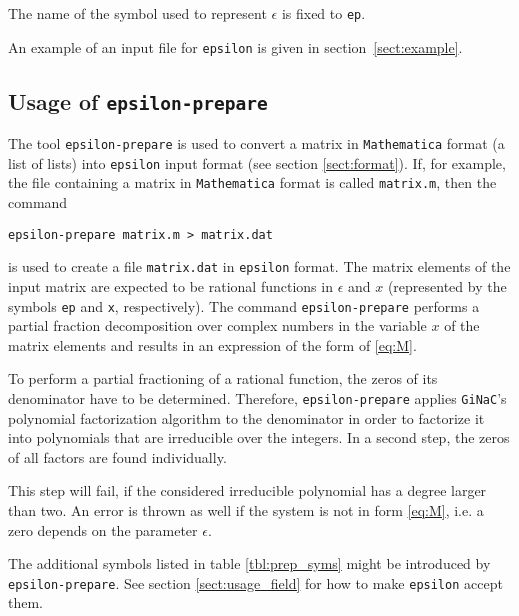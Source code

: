 \documentclass[12pt]{article}
\numberwithin{equation}{section}
\numberwithin{figure}{section}
\begin{document}
      The name of the symbol used to represent $\epsilon$ is fixed to \texttt{ep}.

      An example of an input file for \texttt{epsilon} is given in section~\ref{sect:example}.
    \subsection{Usage of \texttt{epsilon-prepare}}
      The tool \texttt{epsilon-prepare} is used to convert a matrix in \texttt{Mathematica} format (a list of lists) into \texttt{epsilon} input format (see section \ref{sect:format}).
      If, for example, the file containing a matrix in \texttt{Mathematica} format is called \texttt{matrix.m}, then the command
      \begin{lstlisting}[basicstyle=\ttfamily,xleftmargin=-4em]
        epsilon-prepare matrix.m > matrix.dat
      \end{lstlisting}
      is used to create a file \texttt{matrix.dat} in \texttt{epsilon} format.
      The matrix elements of the input matrix are expected to be rational functions in $\epsilon$ and $x$ (represented by the symbols \texttt{ep} and \texttt{x}, respectively).
      The command \texttt{epsilon-prepare} performs a partial fraction decomposition over complex numbers in the variable $x$ of the matrix elements and results in an expression of the form of \eqref{eq:M}.
      
      To perform a partial fractioning of a rational function, the zeros of its denominator have to be determined.
      Therefore, \texttt{epsilon-prepare} applies \texttt{GiNaC}'s polynomial factorization algorithm to the denominator in order to factorize it into polynomials that are irreducible over the integers.
      In a second step, the zeros of all factors are found individually.

      This step will fail, if the considered irreducible polynomial has a degree larger than two.
      An error is thrown as well if the system is not in form \eqref{eq:M}, i.e. a zero depends on the parameter $\epsilon$.

      The additional symbols listed in table \ref{tbl:prep_syms} might be introduced by \texttt{epsilon-prepare}.
      See section \ref{sect:usage_field} for how to make \texttt{epsilon} accept them.
\end{document}
